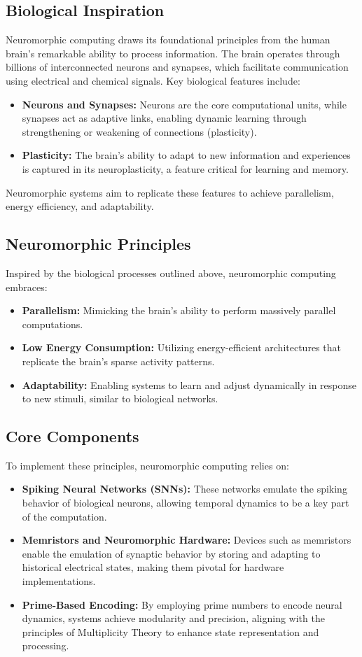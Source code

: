 \documentclass{article}
\theoremstyle{plain}
\begin{document}
\subsection{Biological Inspiration}
Neuromorphic computing draws its foundational principles from the human brain's remarkable ability to process information. The brain operates through billions of interconnected neurons and synapses, which facilitate communication using electrical and chemical signals. Key biological features include:
\begin{itemize}
    \item \textbf{Neurons and Synapses:} Neurons are the core computational units, while synapses act as adaptive links, enabling dynamic learning through strengthening or weakening of connections (plasticity).
    \item \textbf{Plasticity:} The brain's ability to adapt to new information and experiences is captured in its neuroplasticity, a feature critical for learning and memory.
\end{itemize}
Neuromorphic systems aim to replicate these features to achieve parallelism, energy efficiency, and adaptability.

\subsection{Neuromorphic Principles}
Inspired by the biological processes outlined above, neuromorphic computing embraces:
\begin{itemize}
    \item \textbf{Parallelism:} Mimicking the brain's ability to perform massively parallel computations.
    \item \textbf{Low Energy Consumption:} Utilizing energy-efficient architectures that replicate the brain's sparse activity patterns.
    \item \textbf{Adaptability:} Enabling systems to learn and adjust dynamically in response to new stimuli, similar to biological networks.
\end{itemize}

\subsection{Core Components}
To implement these principles, neuromorphic computing relies on:
\begin{itemize}
    \item \textbf{Spiking Neural Networks (SNNs):} These networks emulate the spiking behavior of biological neurons, allowing temporal dynamics to be a key part of the computation.
    \item \textbf{Memristors and Neuromorphic Hardware:} Devices such as memristors enable the emulation of synaptic behavior by storing and adapting to historical electrical states, making them pivotal for hardware implementations.
    \item \textbf{Prime-Based Encoding:} By employing prime numbers to encode neural dynamics, systems achieve modularity and precision, aligning with the principles of Multiplicity Theory to enhance state representation and processing.
\end{itemize}
\end{document}
